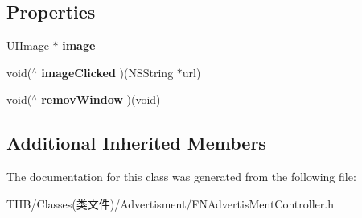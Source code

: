 \subsection*{Properties}
\begin{DoxyCompactItemize}
\item 
\mbox{\label{interface_f_n_advertis_ment_controller_a7ddf0aa772c300008a0ececb830f9b51}} 
U\+I\+Image $\ast$ {\bfseries image}
\item 
\mbox{\label{interface_f_n_advertis_ment_controller_acfb4e0d4d94e1bd73d1572c6fa01e2af}} 
void($^\wedge$ {\bfseries image\+Clicked} )(N\+S\+String $\ast$url)
\item 
\mbox{\label{interface_f_n_advertis_ment_controller_ab16a810460f975f4202e4a47c53c4ca1}} 
void($^\wedge$ {\bfseries remov\+Window} )(void)
\end{DoxyCompactItemize}
\subsection*{Additional Inherited Members}


The documentation for this class was generated from the following file\+:\begin{DoxyCompactItemize}
\item 
T\+H\+B/\+Classes(类文件)/\+Advertisment/F\+N\+Advertis\+Ment\+Controller.\+h\end{DoxyCompactItemize}
